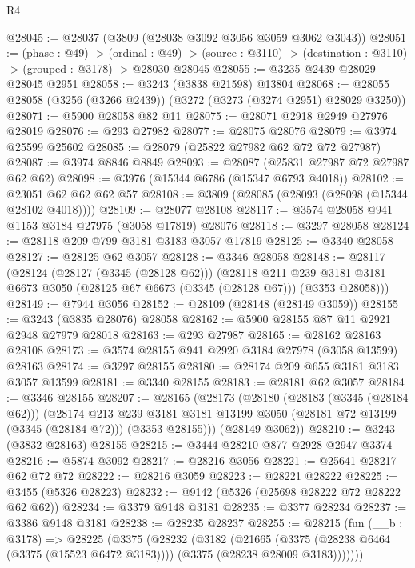 \begin{lexlean}{R4}
\begin{coremodule}
@28045 := @28037 (@3809 (@28038 @3092 @3056 @3059 @3062 @3043))
@28051 := (phase : @49) ->
  (ordinal : @49) -> (source : @3110) -> (destination : @3110) -> (grouped : @3178) -> @28030 @28045
@28055 := @3235 @2439 @28029 @28045 @2951
@28058 := @3243 (@3838 @21598) @13804
@28068 := @28055 @28058 (@3256 (@3266 @2439)) (@3272 (@3273 (@3274 @2951) @28029 @3250))
@28071 := @5900 @28058 @82 @11
@28075 := @28071 @2918 @2949 @27976 @28019
@28076 := @293 @27982
@28077 := @28075 @28076
@28079 := @3974 @25599 @25602
@28085 := @28079 (@25822 @27982 @62 @72 @72 @27987)
@28087 := @3974 @8846 @8849
@28093 := @28087 (@25831 @27987 @72 @27987 @62 @62)
@28098 := @3976 (@15344 @6786 (@15347 @6793 @4018))
@28102 := @23051 @62 @62 @62 @57
@28108 := @3809 (@28085 (@28093 (@28098 (@15344 @28102 @4018))))
@28109 := @28077 @28108
@28117 := @3574 @28058 @941 @1153 @3184 @27975 (@3058 @17819) @28076
@28118 := @3297 @28058
@28124 := @28118 @209 @799 @3181 @3183 @3057 @17819
@28125 := @3340 @28058
@28127 := @28125 @62 @3057
@28128 := @3346 @28058
@28148 := @28117
    (@28124
      (@28127 (@3345 (@28128 @62)))
      (@28118
        @211
        @239
        @3181
        @3181
        @6673
        @3050
        (@28125 @67 @6673 (@3345 (@28128 @67)))
        (@3353 @28058)))
@28149 := @7944 @3056
@28152 := @28109 (@28148 (@28149 @3059))
@28155 := @3243 (@3835 @28076) @28058
@28162 := @5900 @28155 @87 @11 @2921 @2948 @27979 @28018
@28163 := @293 @27987
@28165 := @28162 @28163 @28108
@28173 := @3574 @28155 @941 @2920 @3184 @27978 (@3058 @13599) @28163
@28174 := @3297 @28155
@28180 := @28174 @209 @655 @3181 @3183 @3057 @13599
@28181 := @3340 @28155
@28183 := @28181 @62 @3057
@28184 := @3346 @28155
@28207 := @28165
    (@28173
      (@28180
        (@28183 (@3345 (@28184 @62)))
        (@28174
          @213
          @239
          @3181
          @3181
          @13199
          @3050
          (@28181 @72 @13199 (@3345 (@28184 @72)))
          (@3353 @28155)))
      (@28149 @3062))
@28210 := @3243 (@3832 @28163) @28155
@28215 := @3444 @28210 @877 @2928 @2947 @3374
@28216 := @5874 @3092
@28217 := @28216 @3056
@28221 := @25641 @28217 @62 @72 @72
@28222 := @28216 @3059
@28223 := @28221 @28222
@28225 := @3455 (@5326 @28223)
@28232 := @9142 (@5326 (@25698 @28222 @72 @28222 @62 @62))
@28234 := @3379 @9148 @3181
@28235 := @3377 @28234
@28237 := @3386 @9148 @3181
@28238 := @28235 @28237
@28255 := @28215
    (fun (__b : @3178) =>
    @28225
      (@3375
        (@28232
          (@3182
            (@21665
              (@3375 (@28238 @6464 (@3375 (@15523 @6472 @3183))))
              (@3375 (@28238 @28009 @3183)))))))

\end{coremodule}
\end{lexlean}
